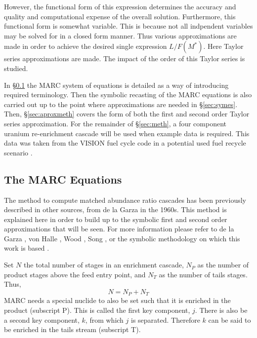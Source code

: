 \documentclass{ansconf}
\begin{document}
However, the functional form of this expression determines the accuracy and 
quality and computational expense of the overall solution.   Furthermore, this 
functional form is somewhat variable.  This is because not all indpendent variables
may be solved for in a closed form manner.    Thus various approximations are made 
in order to achieve the desired single expression  $L/F(M^*)$.  Here Taylor
series approximations are made.  The impact of the order of this Taylor series
is studied.

In \S \ref{sec:marceq} the MARC system of equations is detailed as a way 
of introducing required terminology. 
Then the symbolic recasting of the MARC equations is also carried out up to the
point where approximations are needed in 
\S \ref{sec:symes}.  Then, \S \ref{sec:aproxmeth} covers the form of both 
the first and second order Taylor series approximation.
For the remainder of \S \ref{sec:meth}, a four component uranium re-enrichment 
cascade will be used when example data is required.  This data was taken from the
VISION fuel cycle code in a potential used fuel recycle scenario \cite{Jacobson2009}.

\subsection{The MARC Equations}
\label{sec:marceq}

The method to compute matched abundance ratio cascades has been 
previously described in other sources, from de la Garza in the
1960s. This method is explained here in order to build up to the symbolic first and 
second order approximations that will be seen.
For more information please refer to de la Garza
\cite{DelaGarza1969}, von Halle \cite{VonHalle1987}, Wood \cite{Wood1999}, 
Song \cite{doi:10.1080/01496391003793884}, or the symbolic methodology on which this 
work is based \cite{Scopatz2012}.

Set $N$ the total number of stages in an enrichment cascade, $N_P$ as the number of 
product stages above the feed entry point, and $N_T$ as the number of tails
stages.  Thus,
\begin{equation}
N = N_P + N_T
\end{equation}
MARC needs a special nuclide to also be set such that it is enriched in the 
product (subscript P).  This is called the first key component, $j$.  
There is also be a second key component, $k$, from which $j$ is 
separated. Therefore $k$ can be said to be enriched in the tails stream (subscript T).
\end{document}
